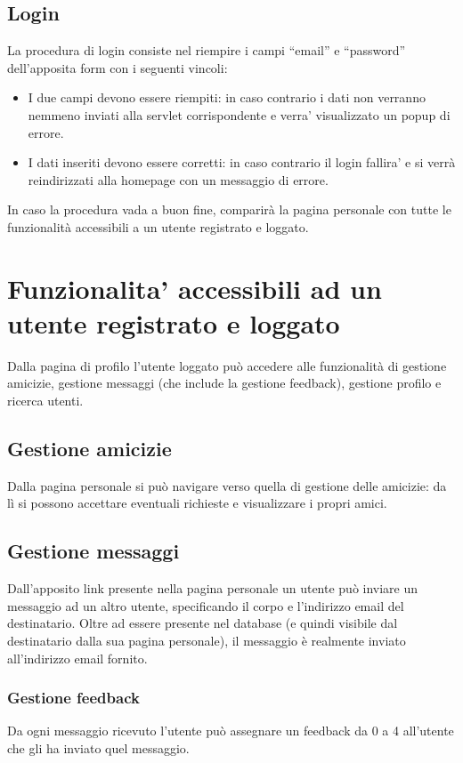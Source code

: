 \documentclass[a4paper,12pt]{article}
\begin{document}
\subsection{Login}
La procedura di login consiste nel riempire i campi ``email'' e ``password'' dell'apposita form con i seguenti vincoli:

\begin{itemize}
 \item I due campi devono essere riempiti: in caso contrario i dati non verranno nemmeno inviati alla servlet corrispondente e verra' visualizzato un popup di errore.
 \item I dati inseriti devono essere corretti: in caso contrario il login fallira' e si verrà reindirizzati alla homepage con un messaggio di errore.
\end{itemize}

In caso la procedura vada a buon fine, comparirà la pagina personale con tutte le funzionalità accessibili a un utente registrato e loggato.

\section{Funzionalita' accessibili ad un utente registrato e loggato}

Dalla pagina di profilo l'utente loggato può accedere alle funzionalità di gestione amicizie, gestione messaggi (che include la gestione feedback), gestione profilo e ricerca utenti.

\subsection{Gestione amicizie}
Dalla pagina personale si può navigare verso quella di gestione delle amicizie: da lì si possono accettare eventuali richieste e visualizzare i propri amici.

\subsection{Gestione messaggi}
Dall'apposito link presente nella pagina personale un utente può inviare un messaggio ad un altro utente, specificando il corpo e l'indirizzo email del destinatario. Oltre ad essere
presente nel database (e quindi visibile dal destinatario dalla sua pagina personale), il messaggio è realmente inviato all'indirizzo email fornito.

\subsubsection{Gestione feedback}
Da ogni messaggio ricevuto l'utente può assegnare un feedback da 0 a 4 all'utente che gli ha inviato quel messaggio.
\end{document}
